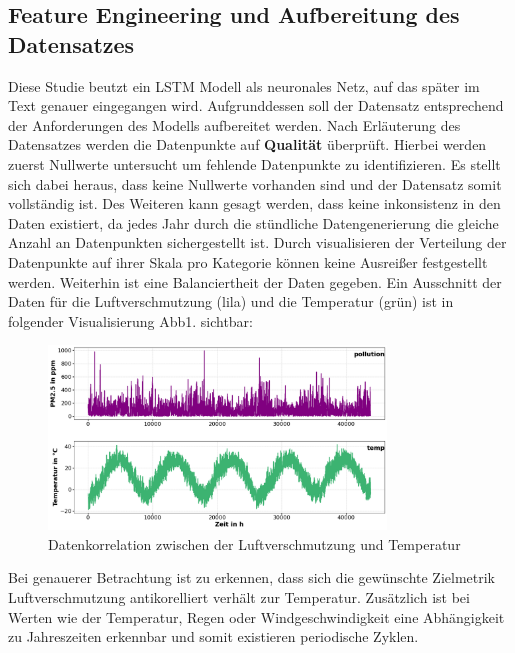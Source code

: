 \documentclass{article}
\begin{document}
  \subsection{Feature Engineering und Aufbereitung des Datensatzes}
Diese Studie beutzt ein LSTM Modell als neuronales Netz, auf das später im Text genauer eingegangen wird.
Aufgrunddessen soll der Datensatz entsprechend der Anforderungen des Modells aufbereitet werden. 
Nach Erläuterung des Datensatzes werden die Datenpunkte auf \textbf{Qualität} überprüft. Hierbei werden zuerst Nullwerte untersucht um fehlende Datenpunkte zu identifizieren. 
Es stellt sich dabei heraus, dass keine Nullwerte vorhanden sind und der Datensatz somit vollständig ist.
Des Weiteren kann gesagt werden, dass keine inkonsistenz in den Daten existiert, da jedes Jahr durch die stündliche Datengenerierung die gleiche Anzahl an Datenpunkten sichergestellt ist.
Durch visualisieren der Verteilung der Datenpunkte auf ihrer Skala pro Kategorie können keine Ausreißer festgestellt werden. Weiterhin ist eine Balanciertheit der Daten gegeben.
Ein Ausschnitt der Daten für die Luftverschmutzung (lila) und die Temperatur (grün) ist in folgender Visualisierung Abb1. sichtbar:
\begin{figure}[h]
  \centering
  \includegraphics[width=0.8\textwidth]{Datenkorrelation_1.png}
  \caption{Datenkorrelation zwischen der Luftverschmutzung und Temperatur}
  \label{fig:fig1}
\end{figure}

Bei genauerer Betrachtung ist zu erkennen, dass sich die gewünschte Zielmetrik Luftverschmutzung antikorelliert verhält zur Temperatur. 
Zusätzlich ist bei Werten wie der Temperatur, Regen oder Windgeschwindigkeit eine Abhängigkeit zu Jahreszeiten erkennbar und somit existieren periodische Zyklen.
\end{document}
